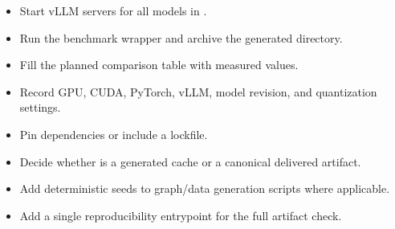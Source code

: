 \documentclass[11pt,a4paper]{article}
\begin{document}
\begin{pendingbox}
\begin{itemize}
  \item Start vLLM servers for all models in .
  \item Run the benchmark wrapper and archive the generated  directory.
  \item Fill the planned comparison table with measured values.
  \item Record GPU, CUDA, PyTorch, vLLM, model revision, and quantization settings.
  \item Pin dependencies or include a lockfile.
  \item Decide whether  is a generated cache or a canonical delivered artifact.
  \item Add deterministic seeds to graph/data generation scripts where applicable.
  \item Add a single reproducibility entrypoint for the full artifact check.
\end{itemize}
\end{pendingbox}



\end{document}
